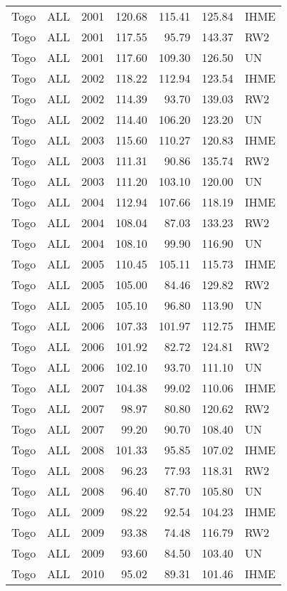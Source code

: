 \begin{longtable}{lllrrrl}
  Togo & ALL & 2001 & 120.68 & 115.41 & 125.84 & IHME \\ 
  Togo & ALL & 2001 & 117.55 & 95.79 & 143.37 & RW2 \\ 
  Togo & ALL & 2001 & 117.60 & 109.30 & 126.50 & UN \\ 
  Togo & ALL & 2002 & 118.22 & 112.94 & 123.54 & IHME \\ 
  Togo & ALL & 2002 & 114.39 & 93.70 & 139.03 & RW2 \\ 
  Togo & ALL & 2002 & 114.40 & 106.20 & 123.20 & UN \\ 
  Togo & ALL & 2003 & 115.60 & 110.27 & 120.83 & IHME \\ 
  Togo & ALL & 2003 & 111.31 & 90.86 & 135.74 & RW2 \\ 
  Togo & ALL & 2003 & 111.20 & 103.10 & 120.00 & UN \\ 
  Togo & ALL & 2004 & 112.94 & 107.66 & 118.19 & IHME \\ 
  Togo & ALL & 2004 & 108.04 & 87.03 & 133.23 & RW2 \\ 
  Togo & ALL & 2004 & 108.10 & 99.90 & 116.90 & UN \\ 
  Togo & ALL & 2005 & 110.45 & 105.11 & 115.73 & IHME \\ 
  Togo & ALL & 2005 & 105.00 & 84.46 & 129.82 & RW2 \\ 
  Togo & ALL & 2005 & 105.10 & 96.80 & 113.90 & UN \\ 
  Togo & ALL & 2006 & 107.33 & 101.97 & 112.75 & IHME \\ 
  Togo & ALL & 2006 & 101.92 & 82.72 & 124.81 & RW2 \\ 
  Togo & ALL & 2006 & 102.10 & 93.70 & 111.10 & UN \\ 
  Togo & ALL & 2007 & 104.38 & 99.02 & 110.06 & IHME \\ 
  Togo & ALL & 2007 & 98.97 & 80.80 & 120.62 & RW2 \\ 
  Togo & ALL & 2007 & 99.20 & 90.70 & 108.40 & UN \\ 
  Togo & ALL & 2008 & 101.33 & 95.85 & 107.02 & IHME \\ 
  Togo & ALL & 2008 & 96.23 & 77.93 & 118.31 & RW2 \\ 
  Togo & ALL & 2008 & 96.40 & 87.70 & 105.80 & UN \\ 
  Togo & ALL & 2009 & 98.22 & 92.54 & 104.23 & IHME \\ 
  Togo & ALL & 2009 & 93.38 & 74.48 & 116.79 & RW2 \\ 
  Togo & ALL & 2009 & 93.60 & 84.50 & 103.40 & UN \\ 
  Togo & ALL & 2010 & 95.02 & 89.31 & 101.46 & IHME \\ 

\end{longtable}
